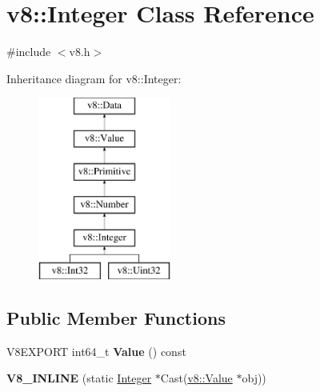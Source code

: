 \hypertarget{classv8_1_1_integer}{}\section{v8\+:\+:Integer Class Reference}
\label{classv8_1_1_integer}


{\ttfamily \#include $<$v8.\+h$>$}

Inheritance diagram for v8\+:\+:Integer\+:\begin{figure}[H]
\begin{center}
\leavevmode
\includegraphics[height=6.000000cm]{classv8_1_1_integer}
\end{center}
\end{figure}
\subsection*{Public Member Functions}
\begin{DoxyCompactItemize}
\item 
\hypertarget{classv8_1_1_integer_ab37942d41df96bf2cd7bb27ba79c4349}{}V8\+E\+X\+P\+O\+R\+T int64\+\_\+t {\bfseries Value} () const \label{classv8_1_1_integer_ab37942d41df96bf2cd7bb27ba79c4349}

\item 
\hypertarget{classv8_1_1_integer_aa652cacbe6f4a0772dff46e1f07d0daf}{}{\bfseries V8\+\_\+\+I\+N\+L\+I\+N\+E} (static \hyperlink{classv8_1_1_integer}{Integer} $\ast$Cast(\hyperlink{classv8_1_1_value}{v8\+::\+Value} $\ast$obj))\label{classv8_1_1_integer_aa652cacbe6f4a0772dff46e1f07d0daf}

\end{DoxyCompactItemize}
